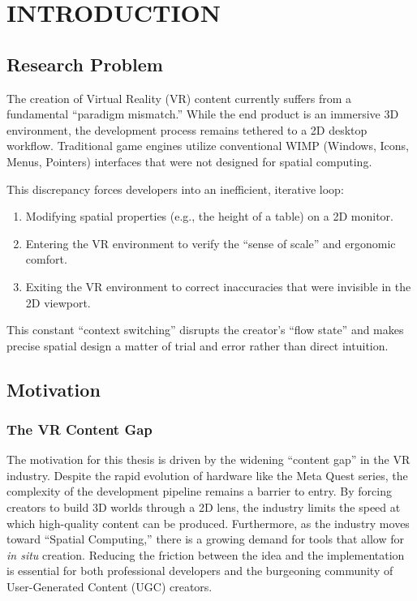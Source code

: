 \documentclass[inscr,ack,preface]{dithesis}
\begin{document}
\frontmatter

\mainmatter

\chapter{INTRODUCTION}

\section{Research Problem}
The creation of Virtual Reality (VR) content currently suffers from a fundamental ``paradigm mismatch.''
While the end product is an immersive 3D environment, the development process remains tethered to a 2D desktop workflow.
Traditional game engines utilize conventional WIMP (Windows, Icons, Menus, Pointers) interfaces that
were not designed for spatial computing.

This discrepancy forces developers into an inefficient, iterative loop:
\begin{enumerate}
  \item Modifying spatial properties (e.g., the height of a table) on a 2D monitor.
  \item Entering the VR environment to verify the ``sense of scale'' and ergonomic comfort.
  \item Exiting the VR environment to correct inaccuracies that were invisible in the 2D viewport.
\end{enumerate}

This constant ``context switching'' disrupts the creator's ``flow state'' and makes precise spatial design a matter
of trial and error rather than direct intuition.

\section{Motivation}

\subsection{The VR Content Gap}

The motivation for this thesis is driven by the widening ``content gap'' in the VR industry. Despite the rapid evolution of hardware
like the Meta Quest series, the complexity of the development pipeline remains a barrier to entry. By forcing creators to build 3D
worlds through a 2D lens, the industry limits the speed at which high-quality content can be produced.
Furthermore, as the industry moves toward ``Spatial Computing,'' there is a growing demand for tools that allow for \textit{in situ} creation.
Reducing the friction between the idea and the implementation is essential for both professional developers and the burgeoning
community of User-Generated Content (UGC) creators.
\end{document}
